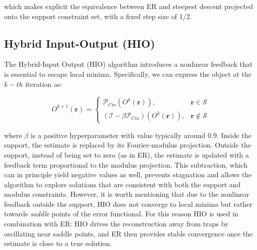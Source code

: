 which makes explicit the equivalence between ER and steepest descent projected onto the support constraint set, with 
a fixed step size of $1/2$.

\subsection{Hybrid Input-Output (HIO)}
The Hybrid-Input Output (HIO) algorithm introduces a nonlinear feedback that is essential to escape local minima. 
Specifically, we can express the object at the $k-th$ iteration as: 

\begin{equation}
    O^{k+1}(\mathbf{r}) = 
    \begin{cases}
        \mathcal{P}_{Cm}(O^{k}(\mathbf{r})), &   \mathbf{r} \in \mathcal{S} \\
        (\mathcal{I} -\beta\mathcal{P}_{Cm})(O^{k}(\mathbf{r})),  & \mathbf{r} \notin \mathcal{S}
     \end{cases}
     \label{eq:HIO}
\end{equation}

where $\beta$ is a positive hyperparameter with value typically around $0.9$.
Inside the support, the estimate is replaced by its Fourier-modulus projection. Outside the support, instead of being 
set to zero (as in ER), the estimate is updated with a feedback term proportional to the modulus projection. 
This subtraction, which can in principle yield negative values as well, prevents stagnation and allows the algorithm 
to explore solutions that are consistent with both the support and modulus constraints.
However, it is worth mentioning that due to the nonlinear feedback outside the support, HIO does not converge to local 
minima but rather towards \textit{saddle} points of the error functional. For this reason HIO is used in
combination with ER: HIO drives the reconstruction away from traps by oscillating near saddle points, and ER then 
provides stable convergence once the estimate is close to a true solution. 

